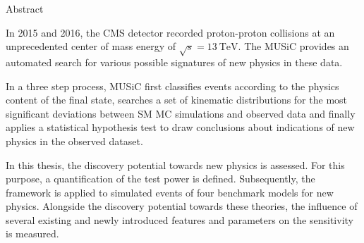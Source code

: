 
{Abstract}
\chapterheadendvskip

In 2015 and 2016, the \acs{CMS} detector recorded proton-proton collisions at an unprecedented center of mass energy of $\sqrt{s} = \SI{13}{\TeV}$. The \acf{MUSiC} provides an automated search for various possible signatures of new physics in these data.

In a three step process, \acs{MUSiC} first classifies events according to the physics content of the final state, searches a set of kinematic distributions for the most significant deviations between \acl{SM} \acl{MC} simulations and observed data and finally applies a statistical hypothesis test to draw conclusions about indications of new physics in the observed dataset.

In this thesis, the discovery potential towards new physics is assessed. For this purpose, a quantification of the test power is defined. Subsequently, the framework is applied to simulated events of four benchmark models for new physics. Alongside the discovery potential towards these theories, the influence of several existing and newly introduced features and parameters on the sensitivity is measured.
